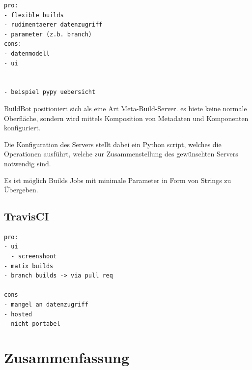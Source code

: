 \begin{verbatim}
pro:
- flexible builds
- rudimentaerer datenzugriff
- parameter (z.b. branch)
cons:
- datenmodell
- ui


- beispiel pypy uebersicht

\end{verbatim}


BuildBot positioniert sich als eine Art Meta-Build-Server.
es biete keine normale Oberfläche, sondern wird mittels
Komposition von Metadaten und Komponenten konfiguriert.

Die Konfiguration des Servers stellt dabei ein Python script,
welches die Operationen ausführt, welche zur Zusammenstellung des gewünschten Servers notwendig sind.

Es ist möglich Builds Jobs mit minimale Parameter in Form von Strings zu Übergeben.

\subsection{TravisCI}

\begin{verbatim}
pro:
- ui
  - screenshoot
- matix builds
- branch builds -> via pull req

cons
- mangel an datenzugriff
- hosted
- nicht portabel
\end{verbatim}



\section{Zusammenfassung}



